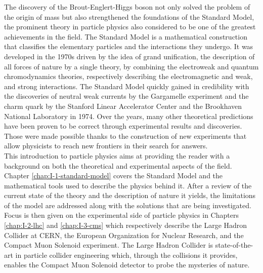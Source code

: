 The discovery of the Brout-Englert-Higgs boson not only solved the problem of the origin of mass but also strengthened the foundations of the Standard Model, the prominent theory in particle physics also considered to be one of the greatest achievements in the field. The Standard Model is a mathematical construction that classifies the elementary particles and the interactions they undergo. It was developed in the 1970s driven by the idea of grand unification, the description of all forces of nature by a single theory, by combining the electroweak and quantum chromodynamics theories, respectively describing the electromagnetic and weak, and strong interactions. The Standard Model quickly gained in credibility with the discoveries of neutral weak currents by the Gargamelle experiment and the charm quark by the Stanford Linear Accelerator Center and the Brookhaven National Laboratory in 1974. Over the years, many other theoretical predictions have been proven to be correct through experimental results and discoveries. Those were made possible thanks to the construction of new experiments that allow physicists to reach new frontiers in their search for answers. \\

This introduction to particle physics aims at providing the reader with a background on both the theoretical and experimental aspects of the field. Chapter \ref{chap:I-1-standard-model} covers the Standard Model and the mathematical tools used to describe the physics behind it. After a review of the current state of the theory and the description of nature it yields, the limitations of the model are addressed along with the solutions that are being investigated. Focus is then given on the experimental side of particle physics in Chapters \ref{chap:I-2-lhc} and \ref{chap:I-3-cms} which respectively describe the Large Hadron Collider at CERN, the European Organization for Nuclear Research, and the Compact Muon Solenoid experiment. The Large Hadron Collider is state-of-the-art in particle collider engineering which, through the collisions it provides, enables the Compact Muon Solenoid detector to probe the mysteries of nature.
